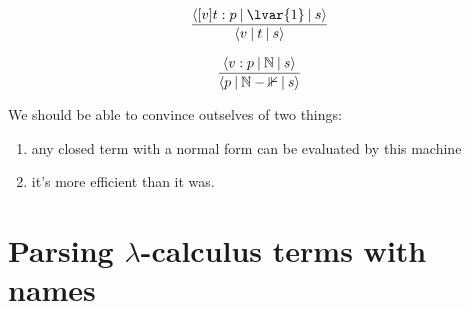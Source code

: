 \documentclass[a4paper]{article}
\begin{document}
$$
\frac{
  \mconfig{\mclosure{t}{v}:p}{\lvar{1}}{s}
}{
  \mconfig{v}{t}{s}
}
$$

$$
\frac{
  \langle v : p \:\vert\: \mathbb{N} \:\vert\: s \rangle
}{
  \langle p \:\vert\: \mathbb{N - 1} \:\vert\: s \rangle
}
$$

We should be able to convince outselves of two things:

\begin{enumerate}
\item any closed term with a normal form can be evaluated by this machine
\item it's more efficient than it was.
\end{enumerate}


\appendix


\section{Parsing $\lambda$-calculus terms with names}
\end{document}
